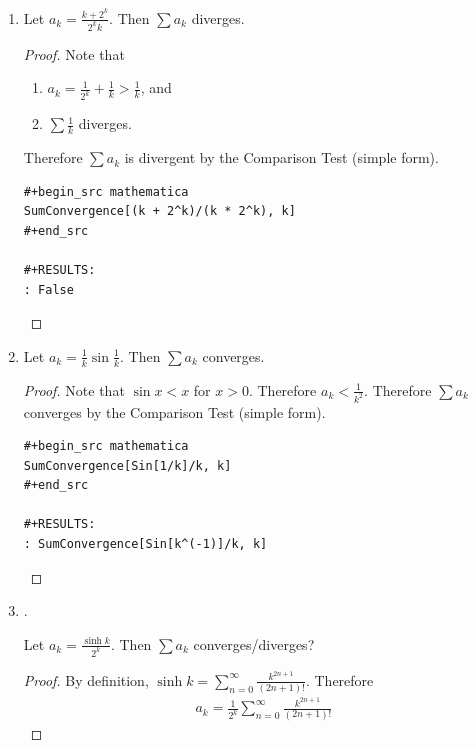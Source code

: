 \documentclass[12pt]{article}
\begin{document}
\begin{enumerate}[label=(\alph*)]
\item
  \begin{claim*}
    Let $a_k = \frac{k + 2^k}{2^kk}$. Then $\sum a_k$ diverges.
  \end{claim*}
  \begin{proof}
    Note that
    \begin{enumerate}
    \item $a_k = \frac{1}{2^k} + \frac{1}{k} > \frac{1}{k}$, and
    \item $\sum \frac{1}{k}$ diverges.
    \end{enumerate}
    Therefore $\sum a_k$ is divergent by the Comparison Test (simple form).

\begin{verbatim}
#+begin_src mathematica
SumConvergence[(k + 2^k)/(k * 2^k), k]
#+end_src

#+RESULTS:
: False
\end{verbatim}
\checkmark
  \end{proof}

\newpage
\item
  \begin{claim*}
    Let $a_k = \frac{1}{k}\sin\frac{1}{k}$. Then $\sum a_k$ converges.
  \end{claim*}
  \begin{proof}
    Note that $\sin x < x$ for $x > 0$. Therefore $a_k < \frac{1}{k^2}$. Therefore $\sum a_k$
    converges by the Comparison Test (simple form).

\begin{verbatim}
#+begin_src mathematica
SumConvergence[Sin[1/k]/k, k]
#+end_src

#+RESULTS:
: SumConvergence[Sin[k^(-1)]/k, k]

\end{verbatim}


  \end{proof}


\newpage
\item {}.
  \begin{claim*}
    Let $a_k = \frac{\sinh k}{2^k}$. Then $\sum a_k$ converges/diverges?
  \end{claim*}
  \begin{proof}
    By definition, $\sinh k = \sum_{n=0}^\infty \frac{k^{2n+1}}{(2n+1)!}$. Therefore
    \begin{align*}
      a_k = \frac{1}{2^k}\sum_{n=0}^\infty \frac{k^{2n+1}}{(2n+1)!}
    \end{align*}
  \end{proof}



\end{enumerate}
\end{document}
